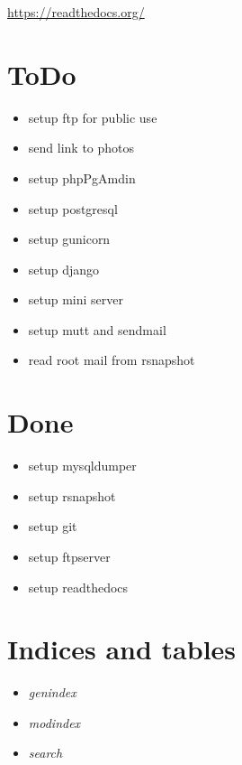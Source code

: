 \documentclass[letterpaper,10pt,english]{sphinxmanual}
\begin{document}
\href{https://readthedocs.org/}{https://readthedocs.org/}


\chapter{ToDo}
\label{index:todo}\begin{itemize}
\item {} 
setup ftp for public use

\item {} 
send link to photos

\item {} 
setup phpPgAmdin

\item {} 
setup postgresql

\item {} 
setup gunicorn

\item {} 
setup django

\item {} 
setup mini server

\item {} 
setup mutt and sendmail

\item {} 
read root mail from rsnapshot

\end{itemize}


\chapter{Done}
\label{index:done}\begin{itemize}
\item {} 
setup mysqldumper

\item {} 
setup rsnapshot

\item {} 
setup git

\item {} 
setup ftpserver

\item {} 
setup readthedocs

\end{itemize}


\chapter{Indices and tables}
\label{index:indices-and-tables}\begin{itemize}
\item {} 
\emph{genindex}

\item {} 
\emph{modindex}

\item {} 
\emph{search}

\end{itemize}



\renewcommand{\indexname}{Index}
\printindex
\end{document}
